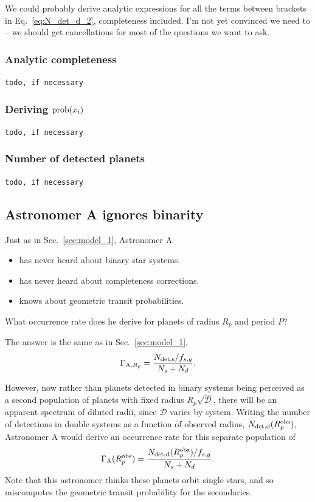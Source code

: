 \documentclass{emulateapj}
\begin{document}
We could probably derive analytic expressions for all the terms between 
brackets in Eq.~\ref{eq:N_det_d_2}, completeness included.
I'm not yet convinced we need to -- we should get cancellations for
most of the questions we want to ask.

\subsubsection{Analytic completeness}
\texttt{todo, if necessary}
\subsubsection{Deriving ${\rm prob}(x_i)$}
\texttt{todo, if necessary}
\subsubsection{Number of detected planets}
\texttt{todo, if necessary}

\subsection{Astronomer A ignores binarity}

Just as in Sec.~\ref{sec:model_1}, Astronomer A
\begin{itemize}
\item has never heard about binary star systems.
\item has never heard about completeness corrections.
\item knows about geometric transit probabilities.
\end{itemize}

What occurrence rate does he derive for planets of radius $R_p$ and period $P$?

The answer is the same as in Sec.~\ref{sec:model_1},
\begin{equation}
\Gamma_{{\rm A}, R_p} = \frac{N_{\rm det,s}/f_{s,g}}{N_s + N_d}.
\end{equation}

However, now rather than planets detected in binary systems being perceived as 
a second population of planets with fixed radius $R_p \sqrt{\mathcal{D}}$, 
there will be an apparent spectrum of diluted radii, since $\mathcal{D}$ 
varies by system.
Writing the number of detections in double systems as a function of observed 
radius, $N_{\rm det,d}(R_p^{\rm obs})$, Astronomer A would derive an 
occurrence rate for this separate population of
\begin{equation}
\Gamma_{\rm A}(R_p^{\rm obs}) = \frac{N_{\rm det,d}(R_p^{\rm 
obs})/f_{s,g}}{N_s + N_d}.
\end{equation}
Note that this astronomer thinks these planets orbit single stars, 
and so miscomputes the geometric transit probability for the secondaries.
\end{document}

